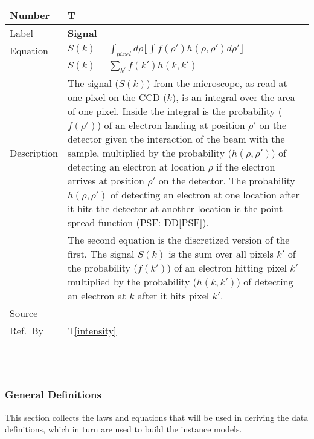 \documentclass[12pt]{article}
\newcommand{\colAwidth}{0.13\textwidth}
\newcommand{\colBwidth}{0.82\textwidth}
\newcommand{\ddref}[1]{DD\ref{#1}}
\newcounter{theorynum} %
\newcommand{\tref}[1]{T\ref{#1}}
\begin{document}
\noindent
\begin{minipage}{\textwidth}
	\renewcommand*{\arraystretch}{1.5}
	\begin{tabular}{| p{\colAwidth} | p{\colBwidth}|}
		  \hline
		  \rowcolor[gray]{0.9}
		  Number& T{theorynum}\thetheorynum \label{signal}\\
		  \hline
		  Label&\bf Signal \\
		  \hline
		  Equation& $S(k)=\int_{pixel}d\rho \lfloor \int f(\rho') h(\rho, \rho') d\rho' \rfloor$ \\
		  & $ S(k)=\sum_{k'} f(k') h(k, k')$\\
		  \hline
		  Description & The signal ($S(k)$) from the microscope, as read at one pixel on the CCD ($k$), is an integral over the area of one pixel. Inside the integral is the probability ($f(\rho')$) of an electron landing at position $\rho'$ on the detector given the interaction of the beam with the sample, multiplied by the probability ($h(\rho, \rho')$) of detecting an electron at location $\rho$ if the electron arrives at position $\rho'$ on the detector. The probability $h(\rho, \rho')$ of detecting an electron at one location after it hits the detector at another location is the point spread function (PSF: \ddref{PSF}).\\
		  & The second equation is the discretized version of the first. The signal $S(k)$ is the sum over all pixels $k'$ of the probability ($f(k')$) of an electron hitting pixel $k'$ multiplied by the probability ($h(k, k')$) of detecting an electron at $k$ after it hits pixel $k'$.\\
		  \hline
		  Source & \cite{zuo_electron_2000}\\
		  \hline
		  Ref.\ By & \tref{intensity}\\
		  \hline
	\end{tabular}
\end{minipage}\\

~\newline

\subsubsection{General Definitions}\label{sec_gendef}

This section collects the laws and equations that will be used in deriving the
data definitions, which in turn are used to build the instance models.
  
\end{document}
